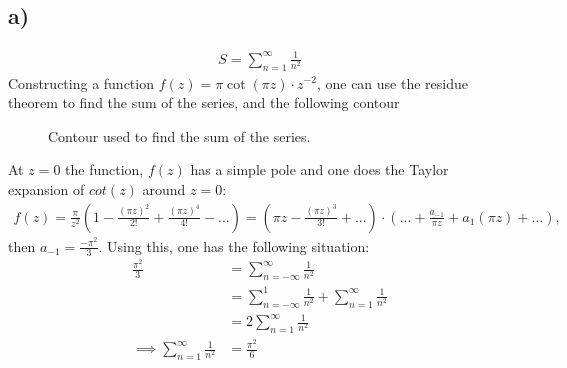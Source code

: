 \documentclass{article}
\begin{document}
\subsection*{a)}
\begin{align*}
    S = \sum_{n=1}^\infty\frac{1}{n^2}
\end{align*}
Constructing a function $f(z) = \pi\cot(\pi z)\cdot z^{-2}$, one can use the residue theorem to find the sum of the series, and the following contour
\begin{figure}[H]
    \centering
    \caption{Contour used to find the sum of the series.}
    \label{fig: task2a)}
\end{figure}\noindent At $z = 0$ the function, $f(z)$ has a simple pole and one does the Taylor expansion of $cot(z)$ around $z = 0$:
\begin{align*}
    f(z) =\frac{\pi}{z^2}\left(1 -\frac{(\pi z)^2}{2!} + \frac{(\pi z)^4}{4!} - ...\right) = \left(\pi z - \frac{(\pi z)^3}{3!} + ...\right) \cdot\left(... + \frac{a_{-1}}{\pi z} +  a_1(\pi z) + ...\right),
\end{align*}then $a_{-1} = \frac{-\pi^2}{3}$. Using this, one has the following situation:
\begin{align*}
    \frac{\pi^2}{3} &= \sum_{n = -\infty}^\infty\frac{1}{n^2}\\
    &= \sum_{n = -\infty}^1\frac{1}{n^2} + \sum_{n = 1}^\infty \frac{1}{n^2}\\
    &= 2\sum_{n = 1}^\infty \frac{1}{n^2}\\
    \implies\sum_{n = 1}^\infty\frac{1}{n^2} &= \frac{\pi^2}{6}
\end{align*}
\end{document}

